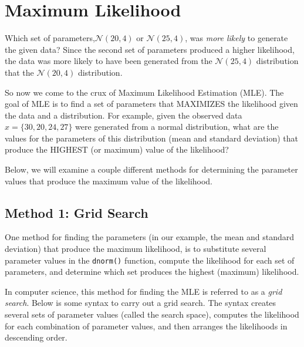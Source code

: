 \documentclass[]{book}
\begin{document}
\hypertarget{maximum-likelihood}{%
\section{Maximum Likelihood}\label{maximum-likelihood}}

Which set of parameters,\(\mathcal{N}(20,4)\) or \(\mathcal{N}(25,4)\), was \emph{more likely} to generate the given data? Since the second set of parameters produced a higher likelihood, the data was more likely to have been generated from the \(\mathcal{N}(25,4)\) distribution that the \(\mathcal{N}(20,4)\) distribution.

So now we come to the crux of Maximum Likelihood Estimation (MLE). The goal of MLE is to find a set of parameters that MAXIMIZES the likelihood given the data and a distribution. For example, given the observed data \(x = \{30, 20, 24, 27\}\) were generated from a normal distribution, what are the values for the parameters of this distribution (mean and standard deviation) that produce the HIGHEST (or maximum) value of the likelihood?

Below, we will examine a couple different methods for determining the parameter values that produce the maximum value of the likelihood.

\hypertarget{method-1-grid-search}{%
\subsection{Method 1: Grid Search}\label{method-1-grid-search}}

One method for finding the parameters (in our example, the mean and standard deviation) that produce the maximum likelihood, is to substitute several parameter values in the \texttt{dnorm()} function, compute the likelihood for each set of parameters, and determine which set produces the highest (maximum) likelihood.

In computer science, this method for finding the MLE is referred to as a \emph{grid search}. Below is some syntax to carry out a grid search. The syntax creates several sets of parameter values (called the search space), computes the likelihood for each combination of parameter values, and then arranges the likelihoods in descending order.
\end{document}
